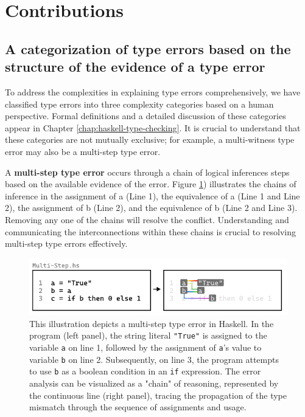 \section{Contributions}

\subsection{A categorization of type errors based on the structure of the evidence of a type error}

To address the complexities in explaining type errors comprehensively, we have classified type errors into three complexity categories based on a human perspective. Formal definitions and a detailed discussion of these categories appear in Chapter \ref{chap:haskell-type-checking}. It is crucial to understand that these categories are not mutually exclusive; for example, a multi-witness type error may also be a multi-step type error.

A \textbf{multi-step type error} occurs through a chain of logical inferences steps based on the available evidence of the error. Figure \ref{fig:multi-step-example}) illustrates the chains of inference in the assignment of a (Line 1), the equivalence of a (Line 1 and Line 2), the assignment of b (Line 2), and the equivalence of b (Line 2 and Line 3). Removing any one of the chains will resolve the conflict. Understanding and communicating the interconnections within these chains is crucial to resolving multi-step type errors effectively.

\begin{figure}[hbt]
  \includegraphics[width=\linewidth]{Multi-Step}
  \caption{
    \label{fig:multi-step-example}
    This illustration depicts a multi-step type error in Haskell. In the program (left panel), the string literal \texttt{"True"} is assigned to the variable \texttt{a} on line 1, followed by the assignment of \texttt{a}'s value to variable \texttt{b} on line 2. Subsequently, on line 3, the program attempts to use \texttt{b} as a boolean condition in an \texttt{if} expression. The error analysis can be visualized as a "chain" of reasoning, represented by the continuous line (right panel), tracing the propagation of the type mismatch through the sequence of assignments and usage. }
\end{figure}

